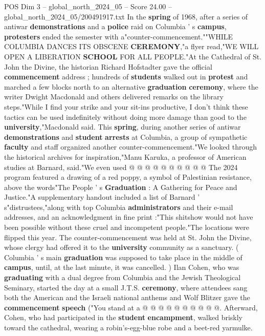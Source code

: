 \begin{textsample}{POS Dim 3 – global\_north\_2024\_05 – Score 24.00 – global\_north\_2024\_05/200491917.txt}  \label{ex:f3_pos_020}
In the \textbf{spring} of 1968, after a series of antiwar \textbf{demonstrations} and a \textbf{police} raid on Columbia ' s \textbf{campus}, \textbf{protesters} ended the semester with a"counter-commencement.""WHILE COLUMBIA DANCES ITS OBSCENE \textbf{CEREMONY},"a flyer read,"WE WILL OPEN A LIBERATION \textbf{SCHOOL} FOR ALL PEOPLE."At the Cathedral of St.
John the Divine, the historian Richard Hofstadter gave the official \textbf{commencement} address ; hundreds of \textbf{students} walked out in \textbf{protest} and marched a few blocks north to an alternative \textbf{graduation} \textbf{ceremony}, where the writer Dwight Macdonald and others delivered remarks on the library steps."While I find your strike and your sit-ins productive, I don't think these tactics can be used indefinitely without doing more damage than good to the \textbf{university},"Macdonald said.
This \textbf{spring}, during another series of antiwar \textbf{demonstrations} and \textbf{student} \textbf{arrests} at Columbia, a group of sympathetic \textbf{faculty} and staff organized another counter-commencement."We looked through the historical archives for inspiration,"Manu Karuka, a professor of American studies at Barnard, said."We even used @ @ @ @ @ @ @ @ @ @ The 2024 program featured a drawing of a red poppy, a symbol of Palestinian resistance, above the words"The People ' s \textbf{Graduation} : A Gathering for Peace and Justice."A supplementary handout included a list of Barnard ' s"distrustees,"along with top Columbia \textbf{administrators} and their e-mail addresses, and an acknowledgment in fine print :"This shitshow would not have been possible without these cruel and incompetent people."The locations were flipped this year.
The counter-commencement was held at St.
John the Divine, whose clergy had offered it to the \textbf{university} community as a sanctuary. ( Columbia ' s main \textbf{graduation} was supposed to take place in the middle of \textbf{campus}, until, at the last minute, it was cancelled. ) Ilan Cohen, who was \textbf{graduating} with a dual degree from Columbia and the Jewish Theological Seminary, started the day at a small J.T.S. \textbf{ceremony}, where attendees sang both the American and the Israeli national anthems and Wolf Blitzer gave the \textbf{commencement} \textbf{speech} ("You stand at a @ @ @ @ @ @ @ @ @ @.
Afterward, Cohen, who had participated in the \textbf{student} \textbf{encampment}, walked briskly toward the cathedral, wearing a robin's-egg-blue robe and a beet-red yarmulke.

\end{textsample}
